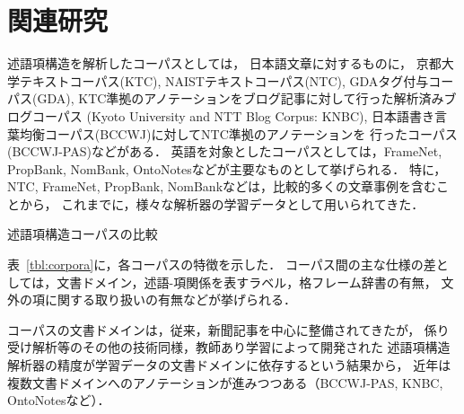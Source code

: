\documentclass[japanese]{jnlp_1.4}
\begin{document}
\section{関連研究}
\label{sec:related_work}

述語項構造を解析したコーパスとしては，
日本語文章に対するものに，
京都大学テキストコーパス(KTC), 
NAISTテキストコーパス(NTC), 
GDAタグ付与コーパス(GDA), 
KTC準拠のアノテーションをブログ記事に対して行った解析済みブログコーパス (Kyoto University and NTT Blog Corpus: KNBC), 
日本語書き言葉均衡コーパス(BCCWJ)に対してNTC準拠のアノテーションを
行ったコーパス(BCCWJ-PAS)などがある．
英語を対象としたコーパスとしては，FrameNet, PropBank, NomBank, OntoNotesなどが主要なものとして挙げられる．
特に，NTC, FrameNet, PropBank, NomBankなどは，比較的多くの文章事例を含むことから，
これまでに，様々な解析器の学習データとして用いられてきた\cite{marquez2008srl,Yoshikawa2011,Iida2011,taira2008japanese}．

\begin{table}[b]
\caption{述語項構造コーパスの比較}
\label{tbl:corpora}

\end{table}

表~\ref{tbl:corpora}に，各コーパスの特徴を示した．
コーパス間の主な仕様の差としては，文書ドメイン，述語-項関係を表すラベル，格フレーム辞書の有無，
文外の項に関する取り扱いの有無などが挙げられる．

コーパスの文書ドメインは，従来，新聞記事を中心に整備されてきたが，
係り受け解析等のその他の技術同様，教師あり学習によって開発された
述語項構造解析器の精度が学習データの文書ドメインに依存するという結果\cite{Carreras:2005:ICS:1706543.1706571}から，
近年は複数文書ドメインへのアノテーションが進みつつある（BCCWJ-PAS, KNBC, OntoNotesなど）．
\end{document}
